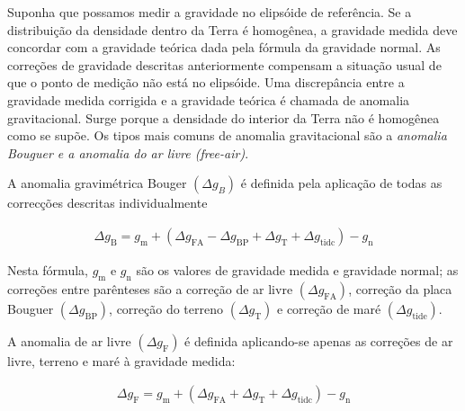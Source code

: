 \documentclass[]{book}
\theoremstyle{definition}
\theoremstyle{definition}
\theoremstyle{definition}
\theoremstyle{remark}
\begin{document}
Suponha que possamos medir a gravidade no elipsóide de referência. Se a distribuição da densidade dentro da Terra é homogênea, a gravidade medida deve concordar com a gravidade teórica dada pela fórmula da gravidade normal. As correções de gravidade descritas anteriormente compensam a situação usual de que o ponto de medição não está no elipsóide. Uma discrepância entre a gravidade medida corrigida e a gravidade teórica é chamada de anomalia gravitacional. Surge porque a densidade do interior da Terra não é homogênea como se supõe. Os tipos mais comuns de anomalia gravitacional são a \emph{anomalia Bouguer e a anomalia do ar livre (free-air)}.

A anomalia gravimétrica Bouger \(\left(\Delta g_{B}\right)\) é definida pela aplicação de todas as correcções descritas individualmente

\begin{align}
\Delta g_{\mathrm{B}}=g_{\mathrm{m}}+\left(\Delta g_{\mathrm{FA}}-\Delta g_{\mathrm{BP}}+\Delta g_{\mathrm{T}}+\Delta g_{\mathrm{tidc}}\right)-g_{\mathrm{n}}
\label{eq:0248}
\end{align}

Nesta fórmula, \(g_{\mathrm{m}}\) e \(g_{\mathrm{n}}\) são os valores de gravidade medida e gravidade normal; as correções entre parênteses são a correção de ar livre \(\left(\Delta g_{\mathrm{FA}}\right)\), correção da placa Bouguer \(\left(\Delta g_{\mathrm{BP}}\right)\), correção do terreno \(\left(\Delta g_{\mathrm{T}}\right)\) e correção de maré \(\left(\Delta g_{\mathrm{tide}}\right)\).

A anomalia de ar livre \(\left(\Delta g_{\mathrm{F}}\right)\) é definida aplicando-se apenas as correções de ar livre, terreno e maré à gravidade medida:

\begin{align}
\Delta g_{\mathrm{F}}=g_{\mathrm{m}}+\left(\Delta g_{\mathrm{FA}}+\Delta g_{\mathrm{T}}+\Delta g_{\mathrm{tidc}}\right)-g_{\mathrm{n}}
\label{eq:0249}
\end{align}
\end{document}
